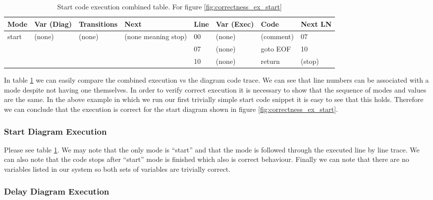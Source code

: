 \begin{table}[htcb]
	\caption{Start code execution combined table. For figure \ref{fig:correctness_ex_start}}
	\centering
	\tablefontsize
		\begin{tabular}{| p{} | p{} | p{} | p{} | p{} | p{} | p{} | p{} |}
			\hline
			\textbf{Mode} 		&	\textbf{Var (Diag)} 		& 	\textbf{Transitions} 		& 	\textbf{Next}		&	\textbf{Line}		&	\textbf{Var (Exec)	}	&	\textbf{Code}	&	\textbf{Next LN} \\
			\hline
			start 				&	(none)						&	(none)						&	(none meaning stop)	&	00					&	(none)					& 	(comment)		&	07 \\
			\hline
								&								&								&						&	07					& 	(none)					& 	goto EOF		& 	10 \\
			\hline
								&								&								&						&	10					&	(none)					&	return			&	(stop) \\
			\hline
		\end{tabular}
	\label{table:BasicExecCombined}
\end{table}

In table \ref{table:BasicExecCombined} we can easily compare the combined execution vs the diagram code trace. 
We can see that line numbers can be associated with a mode despite not having one themselves. In order to verify 
correct execution it is necessary to show that the sequence of modes and values are the same. In the above example
 in which we run our first trivially simple start code snippet it is easy to see that this holds. Therefore we can
  conclude that the execution is correct for the start diagram shown in figure \ref{fig:correctness_ex_start}.

\subsubsection{Start Diagram Execution}

Please see table \ref{table:BasicExecCombined}. We may note that the only mode is ``start'' and that the mode
is followed through the executed line by line trace. We can also note that the code stops after ``start'' 
mode is finished which also is correct behaviour. Finally we can note that there are no variables listed in
our system so both sets of variables are trivially correct.

\subsubsection{Delay Diagram Execution}

